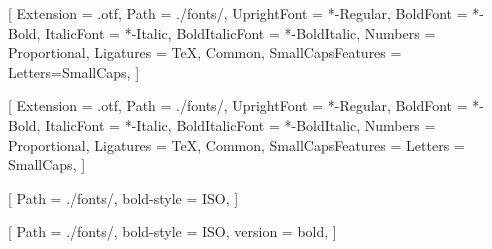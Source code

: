 
\setmainfont{LibertinusSerif}[%
Extension         = .otf,
Path              = ./fonts/,
UprightFont       = *-Regular,
BoldFont          = *-Bold,
ItalicFont        = *-Italic,
BoldItalicFont    = *-BoldItalic,
Numbers           = {Proportional},
Ligatures         = {TeX, Common},
SmallCapsFeatures = {Letters=SmallCaps},
]%

\setsansfont{LibertinusSans}[%
Extension         = .otf,
Path              = ./fonts/,
UprightFont       = *-Regular,
BoldFont          = *-Bold,
ItalicFont        = *-Italic,
BoldItalicFont    = *-BoldItalic,
Numbers           = {Proportional},
Ligatures         = {TeX, Common},
SmallCapsFeatures = {Letters = SmallCaps},
]%


\setmonofont{Latin Modern Mono}
\usepackage{ragged2e} %



[%
Path       = ./fonts/,
bold-style = ISO, %
]%

[%
Path       = ./fonts/,
bold-style = ISO, %
version    = bold,
]%


